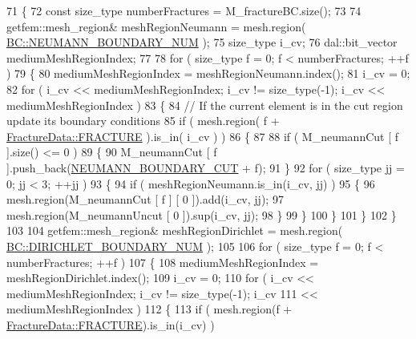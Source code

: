 \begin{DoxyCode}
71 \{
72     \textcolor{keyword}{const} size\_type numberFractures = M\_fractureBC.size();
73 
74     getfem::mesh\_region& meshRegionNeumann = mesh.region( 
      \hyperlink{classBC_ad1b507696802f73b95c0ca59f4c41390a432aa77a00d8eb4929463ef8d57b5c04}{BC::NEUMANN\_BOUNDARY\_NUM} );
75     size\_type i\_cv;
76     dal::bit\_vector mediumMeshRegionIndex;
77 
78     \textcolor{keywordflow}{for} ( size\_type f = 0; f < numberFractures; ++f )
79     \{
80         mediumMeshRegionIndex = meshRegionNeumann.index();
81         i\_cv = 0;
82         \textcolor{keywordflow}{for} ( i\_cv << mediumMeshRegionIndex; i\_cv != size\_type(-1); i\_cv << mediumMeshRegionIndex )
83         \{
84             \textcolor{comment}{// If the current element is in the cut region update its boundary conditions}
85             \textcolor{keywordflow}{if} ( mesh.region( f + \hyperlink{classFractureData_aaeea1f30482432d159eda9d98beb5e89a351538e4c78b34b5c0416e21903e1812}{FractureData::FRACTURE} ).is\_in( i\_cv ) )
86             \{
87 
88                 \textcolor{keywordflow}{if} ( M\_neumannCut [ f ].size() <= 0 )
89                 \{
90                     M\_neumannCut [ f ].push\_back(\hyperlink{classBCHandler_a2bc86209db0836dbc6ca56e1ca4e4ac1add7397a06718591b0c27c067225b1d5f}{NEUMANN\_BOUNDARY\_CUT} + f);
91                 \}
92                 \textcolor{keywordflow}{for} ( size\_type jj = 0; jj < 3; ++jj )
93                 \{
94                     \textcolor{keywordflow}{if} ( meshRegionNeumann.is\_in(i\_cv, jj) )
95                     \{
96                         mesh.region(M\_neumannCut [ f ] [ 0 ]).add(i\_cv, jj);
97                         mesh.region(M\_neumannUncut [ 0 ]).sup(i\_cv, jj);
98                     \}
99                 \}
100             \}
101         \}
102     \}
103 
104     getfem::mesh\_region& meshRegionDirichlet = mesh.region( 
      \hyperlink{classBC_ad1b507696802f73b95c0ca59f4c41390a99103ccd54ba29b1bd2670cc6cd0c462}{BC::DIRICHLET\_BOUNDARY\_NUM} );
105 
106     \textcolor{keywordflow}{for} ( size\_type f = 0; f < numberFractures; ++f )
107     \{
108         mediumMeshRegionIndex = meshRegionDirichlet.index();
109         i\_cv = 0;
110         \textcolor{keywordflow}{for} ( i\_cv << mediumMeshRegionIndex; i\_cv != size\_type(-1); i\_cv
111                 << mediumMeshRegionIndex )
112         \{
113             \textcolor{keywordflow}{if} ( mesh.region(f + \hyperlink{classFractureData_aaeea1f30482432d159eda9d98beb5e89a351538e4c78b34b5c0416e21903e1812}{FractureData::FRACTURE}).is\_in(i\_cv) )

\end{DoxyCode}
